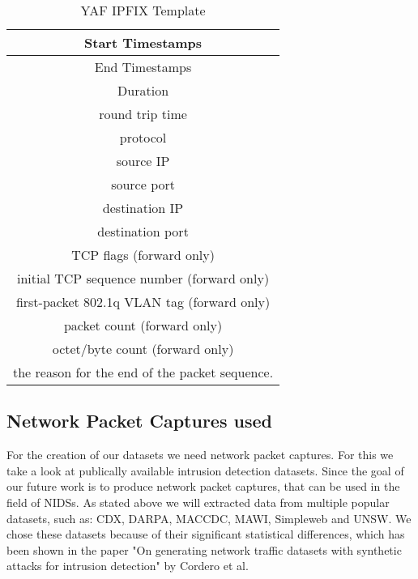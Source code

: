 \documentclass[
	ngerman,
	ruledheaders=section,%
	class=report,%
	thesis={type=bachelor},%
	accentcolor=9c,%
	custommargins=true,%
	marginpar=false,%
	parskip=half-,%
	fontsize=11pt,%
]{tudapub}
\begin{document}
\begin{table}
    \centering
    \begin{tabular}{|c|}
        \hline
        \cellcolor{trivial} Start Timestamps \\
        \hline
        \cellcolor{trivial} End Timestamps \\
        \hline
        \cellcolor{feature} Duration \\
        \hline
        \cellcolor{derivation} round trip time \\
        \hline
        \cellcolor{derivation} protocol \\
        \hline
        \cellcolor{trivial} source IP \\
        \hline
        \cellcolor{derivation} source port \\
        \hline
        \cellcolor{trivial} destination IP \\
        \hline
        \cellcolor{derivation} destination port \\
        \hline
        \cellcolor{derivation} TCP flags (forward only) \\
        \hline
        \cellcolor{derivation} initial TCP sequence number (forward only) \\
        \hline
        \cellcolor{derivation} first-packet 802.1q VLAN tag (forward only) \\
        \hline
        \cellcolor{feature} packet count (forward only) \\
        \hline
        \cellcolor{feature} octet/byte count (forward only) \\
        \hline
        \cellcolor{derivation} the reason for the end of the packet sequence. \\
        \hline
    \end{tabular}
    \caption{YAF IPFIX Template}
\end{table}

\subsection{Network Packet Captures used}

For the creation of our datasets we need network packet captures.
For this we take a look at publically available intrusion detection datasets.
Since the goal of our future work is to produce network packet captures, that can be used in the field of NIDSs.
As stated above we will extracted data from multiple popular datasets, such as: CDX, DARPA, MACCDC, MAWI, Simpleweb and UNSW.
We chose these datasets because of their significant statistical differences, which has been shown in the paper "On generating network traffic datasets with synthetic attacks for intrusion detection" by Cordero et al.
\end{document}
